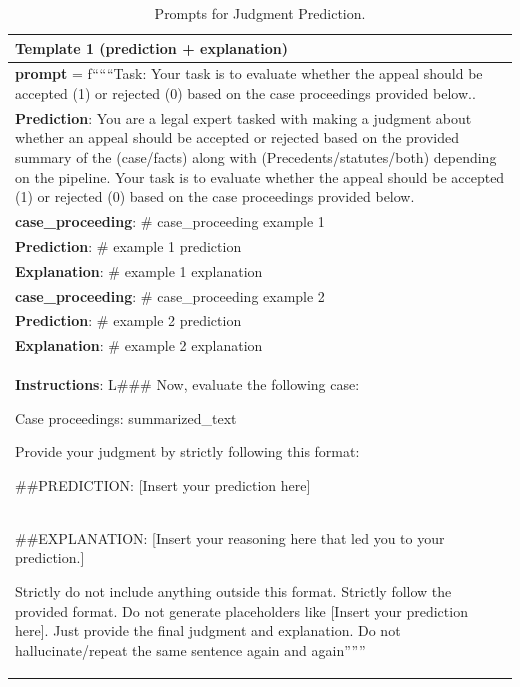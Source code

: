 \begin{table}[ht]
    \centering
    \begin{tabular}{|p{}|}
    \hline
{\bf Template 1 (prediction + explanation)}\\
\hline
   
{\bf prompt} = f``````Task: Your task is to evaluate whether the appeal should be accepted (1) or rejected (0) based on the case proceedings provided below..\\


{\bf Prediction}: You are a legal expert tasked with making a judgment about whether an appeal should be accepted or rejected based on the provided summary of the (case/facts) along with (Precedents/statutes/both) depending on the pipeline. Your task is to evaluate whether the appeal should be accepted (1) or rejected (0) based on the case proceedings provided below. \\


  {\bf case\_proceeding}: \# case\_proceeding example 1\\


  {\bf Prediction}: \# example 1 prediction \\


  {\bf Explanation}: \# example 1 explanation\\


  {\bf case\_proceeding}: \# case\_proceeding example 2\\


 {\bf  Prediction}: \# example 2 prediction\\


 {\bf Explanation}: \# example 2 explanation\\


{\bf Instructions}: L\#\#\# Now, evaluate the following case:
        
Case proceedings: {summarized\_text}
        
Provide your judgment by strictly following this format:

\#\#PREDICTION: [Insert your prediction here]\\
\#\#EXPLANATION: [Insert your reasoning here that led you to your prediction.]
           
Strictly do not include anything outside this format. Strictly follow the provided format. Do not generate placeholders like [Insert your prediction here]. Just provide the final judgment and explanation. Do not hallucinate/repeat the same sentence again and 
again''''''\\
\hline

    \end{tabular}
    \caption{Prompts for Judgment Prediction.}
    \label{tab:judgment_prediction_prompts_few}
\end{table}


